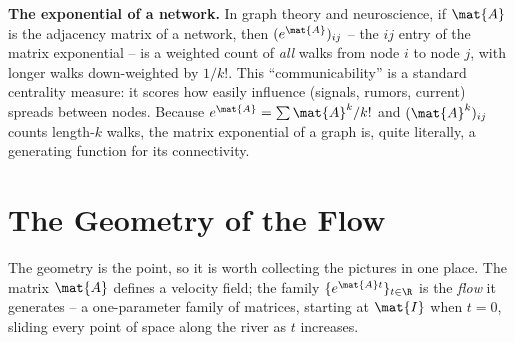 \begin{applicationbox}
\textbf{The exponential of a network.} In graph theory and neuroscience, if
$\mat{A}$ is the adjacency matrix of a network, then $(e^{\mat{A}})_{ij}$ -- the
$ij$ entry of the matrix exponential -- is a weighted count of \emph{all} walks
from node $i$ to node $j$, with longer walks down-weighted by $1/k!$. This
``communicability'' is a standard centrality measure: it scores how easily
influence (signals, rumors, current) spreads between nodes. Because
$e^{\mat{A}}=\sum \mat{A}^k/k!$ and $(\mat{A}^k)_{ij}$ counts length-$k$ walks, the
matrix exponential of a graph is, quite literally, a generating function for its
connectivity.
\end{applicationbox}

\section{The Geometry of the Flow}
\label{ch25:geometry}

The geometry is the point, so it is worth collecting the pictures in one place. The
matrix $\mat{A}$ defines a velocity field; the family $\{e^{\mat{A}t}\}_{t\in\R}$
is the \emph{flow} it generates -- a one-parameter family of matrices, starting
at $\mat{I}$ when $t=0$, sliding every point of space along the river as $t$
increases.

